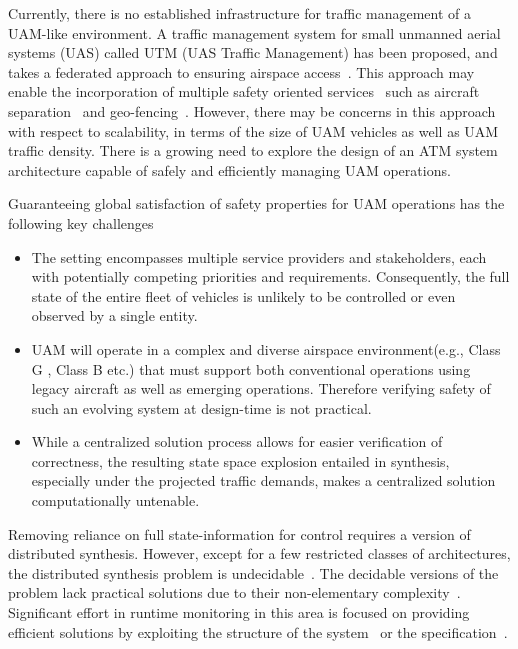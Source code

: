 Currently, there is no established infrastructure for traffic management of a UAM-like environment. A traffic management system for small unmanned aerial systems (UAS) called UTM (UAS Traffic Management) has been proposed, and takes a federated approach to ensuring airspace access~\cite{PRKRJJ2016}.  This approach may enable the incorporation of multiple safety oriented services~\cite{MBYDLGMC2018} such as aircraft separation~\cite{Daidalus} and geo-fencing~\cite{NCDDASC2018}.  However, there may be concerns in this approach with respect to scalability, in terms of the size of UAM vehicles as well as UAM traffic density. %
There is a growing need to explore the design of an ATM system architecture capable of safely and efficiently managing UAM operations. 

Guaranteeing global satisfaction of safety properties for UAM operations has the following key challenges

\begin{itemize}
    \item The setting encompasses multiple service providers and stakeholders, each with potentially competing priorities and requirements. Consequently, the full state of the entire fleet of vehicles is unlikely to be controlled or even observed by a single entity. 
    \item UAM will operate in a complex and diverse airspace environment(e.g., Class G \cite{FAA2014}, Class B etc.) that must support both conventional operations using legacy aircraft as well as emerging operations. Therefore verifying safety of such an evolving system at design-time is not practical.
    \item While a centralized solution process allows for easier verification of correctness, the resulting state space explosion entailed in synthesis, especially under the projected traffic demands, makes a centralized solution computationally untenable. 
\end{itemize}


Removing reliance on full state-information for control requires a version of distributed synthesis. However, except for a few restricted classes of architectures, the distributed synthesis problem is undecidable~\cite{SCHEWE2014203}. The decidable versions of the problem lack practical solutions due to their non-elementary complexity~\cite{Schewe08}. Significant effort in runtime monitoring in this area is focused on providing efficient solutions by exploiting  the structure of the system~\cite{FalconeJNBB15,CassarF16} or the specification~\cite{FrancalanzaS15,BauerF16}. %


